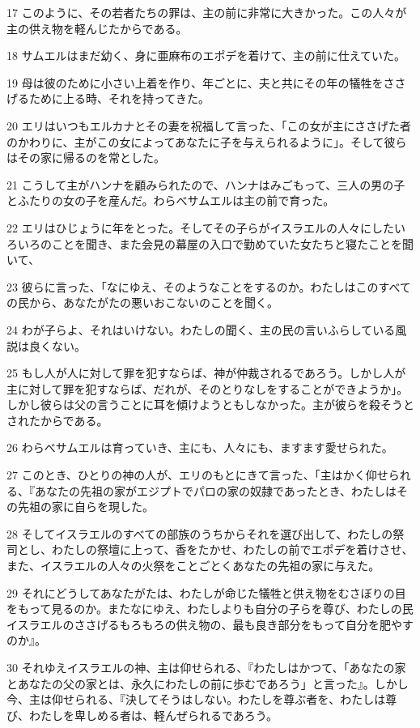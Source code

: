\par 17 このように、その若者たちの罪は、主の前に非常に大きかった。この人々が主の供え物を軽んじたからである。
\par 18 サムエルはまだ幼く、身に亜麻布のエポデを着けて、主の前に仕えていた。
\par 19 母は彼のために小さい上着を作り、年ごとに、夫と共にその年の犠牲をささげるために上る時、それを持ってきた。
\par 20 エリはいつもエルカナとその妻を祝福して言った、「この女が主にささげた者のかわりに、主がこの女によってあなたに子を与えられるように」。そして彼らはその家に帰るのを常とした。
\par 21 こうして主がハンナを顧みられたので、ハンナはみごもって、三人の男の子とふたりの女の子を産んだ。わらべサムエルは主の前で育った。
\par 22 エリはひじょうに年をとった。そしてその子らがイスラエルの人々にしたいろいろのことを聞き、また会見の幕屋の入口で勤めていた女たちと寝たことを聞いて、
\par 23 彼らに言った、「なにゆえ、そのようなことをするのか。わたしはこのすべての民から、あなたがたの悪いおこないのことを聞く。
\par 24 わが子らよ、それはいけない。わたしの聞く、主の民の言いふらしている風説は良くない。
\par 25 もし人が人に対して罪を犯すならば、神が仲裁されるであろう。しかし人が主に対して罪を犯すならば、だれが、そのとりなしをすることができようか」。しかし彼らは父の言うことに耳を傾けようともしなかった。主が彼らを殺そうとされたからである。
\par 26 わらべサムエルは育っていき、主にも、人々にも、ますます愛せられた。
\par 27 このとき、ひとりの神の人が、エリのもとにきて言った、「主はかく仰せられる、『あなたの先祖の家がエジプトでパロの家の奴隷であったとき、わたしはその先祖の家に自らを現した。
\par 28 そしてイスラエルのすべての部族のうちからそれを選び出して、わたしの祭司とし、わたしの祭壇に上って、香をたかせ、わたしの前でエポデを着けさせ、また、イスラエルの人々の火祭をことごとくあなたの先祖の家に与えた。
\par 29 それにどうしてあなたがたは、わたしが命じた犠牲と供え物をむさぼりの目をもって見るのか。またなにゆえ、わたしよりも自分の子らを尊び、わたしの民イスラエルのささげるもろもろの供え物の、最も良き部分をもって自分を肥やすのか』。
\par 30 それゆえイスラエルの神、主は仰せられる、『わたしはかつて、「あなたの家とあなたの父の家とは、永久にわたしの前に歩むであろう」と言った』。しかし今、主は仰せられる、『決してそうはしない。わたしを尊ぶ者を、わたしは尊び、わたしを卑しめる者は、軽んぜられるであろう。
